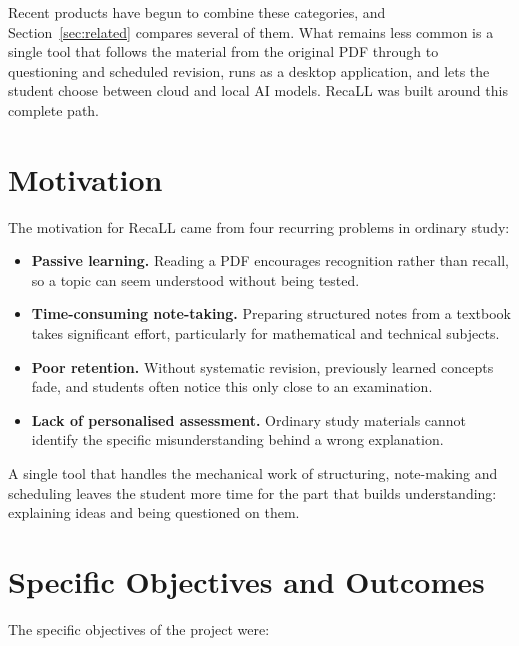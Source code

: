 \documentclass[12pt,a4paper]{article}
\begin{document}
Recent products have begun to combine these categories, and Section~\ref{sec:related}
compares several of them. What remains less common is a single tool that follows the
material from the original PDF through to questioning and scheduled revision, runs as a
desktop application, and lets the student choose between cloud and local AI models.
RecaLL was built around this complete path.

\section{Motivation}
The motivation for RecaLL came from four recurring problems in ordinary study:

\begin{itemize}[leftmargin=*]
  \item \textbf{Passive learning.} Reading a PDF encourages recognition rather than
  recall, so a topic can seem understood without being tested.
  \item \textbf{Time-consuming note-taking.} Preparing structured notes from a textbook
  takes significant effort, particularly for mathematical and technical subjects.
  \item \textbf{Poor retention.} Without systematic revision, previously learned
  concepts fade, and students often notice this only close to an examination.
  \item \textbf{Lack of personalised assessment.} Ordinary study materials cannot
  identify the specific misunderstanding behind a wrong explanation.
\end{itemize}

A single tool that handles the mechanical work of structuring, note-making and
scheduling leaves the student more time for the part that builds understanding:
explaining ideas and being questioned on them.

\section{Specific Objectives and Outcomes}
The specific objectives of the project were:
\end{document}
